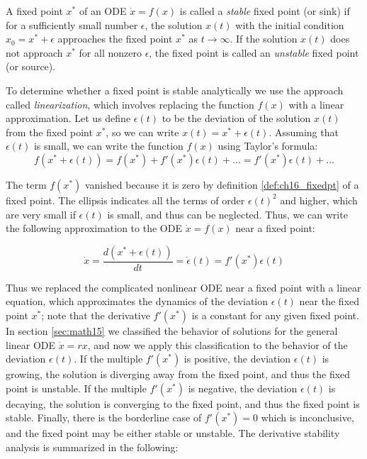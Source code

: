 \documentclass[
  letterpaper,
  DIV=11,
  numbers=noendperiod]{scrreprt}
\begin{document}
\begin{tcolorbox}[enhanced jigsaw, arc=.35mm, colframe=quarto-callout-note-color-frame, left=2mm, opacitybacktitle=0.6, breakable, title=\textcolor{quarto-callout-note-color}{\faInfo}\hspace{0.5em}{Definition}, toprule=.15mm, coltitle=black, bottomtitle=1mm, toptitle=1mm, colback=white, leftrule=.75mm, colbacktitle=quarto-callout-note-color!10!white, titlerule=0mm, opacityback=0, rightrule=.15mm, bottomrule=.15mm]

A fixed point \(x^*\) of an ODE \(\dot x = f(x)\) is called a
\emph{stable} fixed point (or sink) if for a sufficiently small number
\(\epsilon\), the solution \(x(t)\) with the initial condition
\(x_0 = x^* + \epsilon\) approaches the fixed point \(x^*\) as
\(t \rightarrow \infty\). If the solution \(x(t)\) does not approach
\(x^*\) for all nonzero \(\epsilon\), the fixed point is called an
\emph{unstable} fixed point (or source).

\end{tcolorbox}

To determine whether a fixed point is stable analytically we use the
approach called
\emph{linearization}, which involves replacing the function \(f(x)\)
with a linear approximation. Let us define \(\epsilon(t)\) to be the
deviation of the solution \(x(t)\) from the fixed point \(x^*\), so we
can write \(x(t) = x^* + \epsilon(t)\). Assuming that \(\epsilon(t)\) is
small, we can write the function \(f(x)\) using Taylor's formula:
\[ f(x^*+\epsilon(t))= f(x^*)+f'(x^*) \epsilon(t) + ... = f'(x^*) \epsilon(t) + ... \]

The term \(f(x^*)\) vanished because it is zero by definition
\ref{def:ch16_fixedpt} of a fixed point. The ellipsis indicates all the
terms of order \(\epsilon(t)^2\) and higher, which are very small if
\(\epsilon(t)\) is small, and thus can be neglected. Thus, we can write
the following approximation to the ODE \(\dot x = f(x)\) near a fixed
point:

\[ \dot x =  \frac{d(x^* + \epsilon(t))}{dt} = \dot \epsilon(t) =  f'(x^*) \epsilon(t)\]

Thus we replaced the complicated nonlinear ODE near a fixed point with a
linear equation, which approximates the dynamics of the deviation
\(\epsilon(t)\) near the fixed point \(x^*\); note that the derivative
\(f'(x^*)\) is a constant for any given fixed point. In section
\ref{sec:math15} we classified the behavior of solutions for the general
linear ODE \(\dot x = rx\), and now we apply this classification to the
behavior of the deviation \(\epsilon(t)\). If the multiple \(f'(x^*)\)
is positive, the deviation \(\epsilon(t)\) is growing, the solution is
diverging away from the fixed point, and thus the fixed point is
unstable. If the multiple \(f'(x^*)\) is negative, the deviation
\(\epsilon(t)\) is decaying, the solution is converging to the fixed
point, and thus the fixed point is stable. Finally, there is the
borderline case of \(f'(x^*) = 0\) which is inconclusive, and the fixed
point may be either stable or unstable. The
 derivative stability
analysis is summarized in the following:
\end{document}
